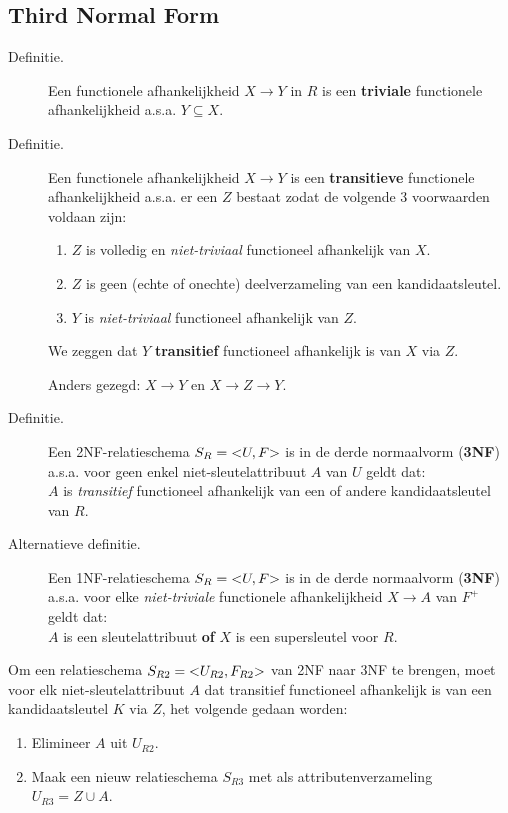 \subsection{Third Normal Form}
\begin{description}
	\item[Definitie.] Een functionele afhankelijkheid $X \rightarrow Y$  in $R$ is een \textbf{triviale} functionele afhankelijkheid a.s.a. $Y \subseteq X$.

	\item[Definitie.] Een functionele afhankelijkheid $X \rightarrow Y$ is een \textbf{transitieve} functionele afhankelijkheid a.s.a. er een $Z$ bestaat zodat de volgende 3 voorwaarden voldaan zijn:
	\begin{enumerate}
		\item $Z$ is volledig en \textit{niet-triviaal} functioneel afhankelijk van $X$.
		\item $Z$ is geen (echte of onechte) deelverzameling van een kandidaatsleutel.
		\item $Y$ is \textit{niet-triviaal} functioneel afhankelijk van $Z$.
	\end{enumerate}
	We zeggen dat $Y$ \textbf{transitief} functioneel afhankelijk is van $X$ via $Z$.

	Anders gezegd: $X \rightarrow Y$ en $X \rightarrow Z \rightarrow Y$.

	\item[Definitie.] Een 2NF-relatieschema $S_R = \text{\textless} U,F \text{\textgreater}$ is in de derde normaalvorm (\textbf{3NF}) a.s.a. voor geen enkel niet-sleutelattribuut $A$ van $U$ geldt dat:\\
	$A$ is \textit{transitief} functioneel afhankelijk van een of andere kandidaatsleutel van $R$.

	\item[Alternatieve definitie.] Een 1NF-relatieschema $S_R = \text{\textless} U,F \text{\textgreater}$ is in de derde normaalvorm (\textbf{3NF}) a.s.a. voor elke \textit{niet-triviale} functionele afhankelijkheid $X \rightarrow A$ van $F^+$ geldt dat:\\
	$A$ is een sleutelattribuut \textbf{of} $X$ is een supersleutel voor $R$.
\end{description}
Om een relatieschema $S_{R2} = \text{\textless} U_{R2}, F_{R2} \text{\textgreater}$ van 2NF naar 3NF te brengen, moet voor elk niet-sleutelattribuut $A$ dat transitief functioneel afhankelijk is van een kandidaatsleutel  $K$ via $Z$, het volgende gedaan worden:
\begin{enumerate}
	\item Elimineer $A$ uit $U_{R2}$.
	\item Maak een nieuw relatieschema $S_{R3}$ met als attributenverzameling $U_{R3} = Z \cup A$.
\end{enumerate}

